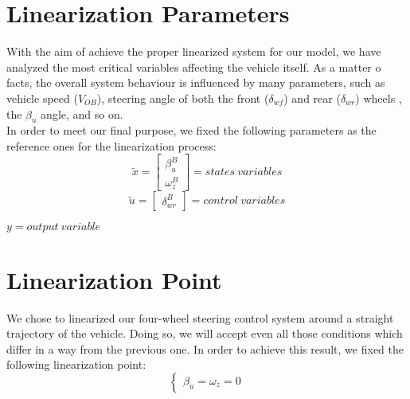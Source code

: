 \documentclass[a4paper,12pt,titlepage]{report}
\begin{document}
\section{Linearization Parameters} 
	With the aim of achieve the proper linearized system for our model, we have analyzed the most critical variables affecting the vehicle itself. As a matter o facts, the overall system behaviour is influenced by many parameters, such as vehicle speed ($V_{OB}$), steering angle of both the front ($\delta_{wf}$) and rear ($\delta_{wr}$) wheels , the $\beta_{u}$ angle, and so on. \\
	In order to meet our final purpose, we fixed the following parameters as the reference ones for the linearization process:\\
		\begin{equation*}
			\tilde{x} =
			\begin{bmatrix}
			\beta_{u}^{B} \\\omega_{z}^{B}
			\end{bmatrix} = states \ variables
		\end{equation*}\quad
		\begin{equation*} 
			\tilde{u} =
			\begin{bmatrix}
			\delta_{wr}^{B} 
			\end{bmatrix} = control \ variables
		\end{equation*}\quad
		\begin{center}
			$ y = output \ variable $	
		\end{center}
			\begin{comment}
			\begin{equation*} 
				\tilde{d} =
				\begin{bmatrix}
				\delta_{wf}^{B} 
				\end{bmatrix} = disturbance \ variables
			\end{equation*}
			\end{comment}
\section{Linearization Point} 
	We chose to linearized our four-wheel steering control system around a straight trajectory of the vehicle. Doing so, we will accept even all those conditions which differ in a way from the previous one. In order to achieve this result, we fixed the following linearization point:
		\begin{equation*}
			\begin{cases}
				\beta_{u} = \omega_{z} = 0
			\end{cases}
		\end{equation*}
\end{document}
